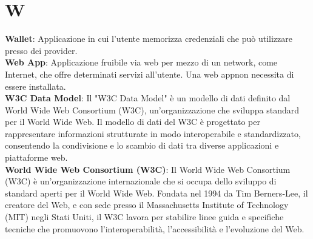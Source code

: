\section{W}
\textbf{Wallet}: Applicazione in cui l'utente memorizza credenziali che può utilizzare presso dei provider.\\ %
\textbf{Web App}: Applicazione fruibile via web per mezzo di un network, come Internet, che offre determinati servizi all'utente. Una web app\glo non necessita di essere installata.\\
\textbf{W3C Data Model}: Il "W3C Data Model" è un modello di dati definito dal World Wide Web Consortium (W3C), un'organizzazione che sviluppa standard per il World Wide Web. Il modello di dati del W3C è progettato per rappresentare informazioni strutturate in modo interoperabile e standardizzato, consentendo la condivisione e lo scambio di dati tra diverse applicazioni e piattaforme web.\\
\textbf{World Wide Web Consortium (W3C)}: Il World Wide Web Consortium (W3C) è un'organizzazione internazionale che si occupa dello sviluppo di standard aperti per il World Wide Web. Fondata nel 1994 da Tim Berners-Lee, il creatore del Web, e con sede presso il Massachusetts Institute of Technology (MIT) negli Stati Uniti, il W3C lavora per stabilire linee guida e specifiche tecniche che promuovono l'interoperabilità, l'accessibilità e l'evoluzione del Web.\\
